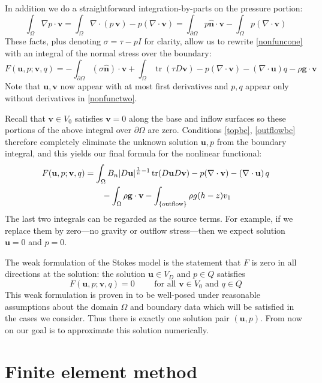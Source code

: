 \documentclass[letterpaper,final,12pt,reqno]{amsart}
\newcommand{\trace}{\operatorname{tr}}
\newcommand{\hbn}{\hat{\mathbf{n}}}
\newcommand{\bu}{\mathbf{u}}
\newcommand{\bv}{\mathbf{v}}
\begin{document}
In addition we do a straightforward integration-by-parts on the pressure portion:
    $$\int_\Omega \nabla p \cdot \bv = \int_\Omega \nabla\cdot (p\,\bv) - p (\nabla \cdot \bv) = \int_{\partial \Omega} p\hbn \cdot \bv - \int_\Omega p (\nabla \cdot \bv)$$
These facts, plus denoting $\sigma=\tau-pI$ for clarity, allow us to rewrite \eqref{nonfuncone} with an integral of the normal stress over the boundary:
\begin{equation}
F(\bu,p;\bv,q) = -\int_{\partial\Omega} (\sigma \hbn)\cdot \bv + \int_\Omega \trace(\tau D\bv) - p (\nabla \cdot \bv) - \left(\nabla \cdot \bu\right) q - \rho \mathbf{g} \cdot \bv \label{nonfunctwo}
\end{equation}
Note that $\bu,\bv$ now appear with at most first derivatives and $p,q$ appear only without derivatives in \eqref{nonfunctwo}.

Recall that $\bv\in V_0$ satisfies $\bv=0$ along the base and inflow surfaces so these portions of the above integral over $\partial\Omega$ are zero.  Conditions \eqref{topbc}, \eqref{outflowbc} therefore completely eliminate the unknown solution $\bu,p$ from the boundary integral, and this yields our final formula for the nonlinear functional:
\begin{align}
F(\bu,p;\bv,q) &= \int_\Omega B_n |D\bu|^{\frac{1}{n} - 1} \trace(D\bu D\bv) - p (\nabla \cdot \bv) - \left(\nabla \cdot \bu\right) q \label{defineF} \\
    &\qquad  - \int_\Omega \rho \mathbf{g} \cdot \bv - \int_{\{\text{outflow}\}} \rho g (h-z) v_1  \notag
\end{align}
The last two integrals can be regarded as the source terms.  For example, if we replace them by zero---no gravity or outflow stress---then we expect solution $\bu=0$ and $p=0$.

The weak formulation of the Stokes model is the statement that $F$ is zero in all directions at the solution: the solution $\bu\in V_D$ and $p\in Q$ satisfies
\begin{equation}
F(\bu,p;\bv,q) = 0 \qquad \text{ for all } \bv\in V_0 \text{ and } q\in Q  \label{weak}
\end{equation}
This weak formulation is proven in \cite{JouvetRappaz2011} to be well-posed under reasonable assumptions about the domain $\Omega$ and boundary data which will be satisfied in the cases we consider.  Thus there is exactly one solution pair $(\bu,p)$.  From now on our goal is to approximate this solution numerically.


\section{Finite element method}
\end{document}

